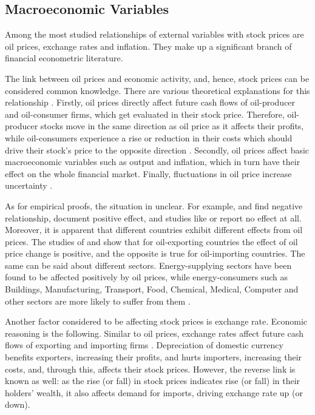 \documentclass[stu]{apa7}
\begin{document}
\subsection{Macroeconomic Variables}

Among the most studied relationships of external variables with stock prices are oil prices, exchange rates and inflation. They make up a significant branch of financial econometric literature.

The link between oil prices and economic activity, and, hence, stock prices can be considered common knowledge. There are various theoretical explanations for this relationship \citep{degiannakis_oil_2018}.
Firstly, oil prices directly affect future cash flows of oil-producer and oil-consumer firms, which get evaluated in their stock price. Therefore, oil-producer stocks move in the same direction as oil price as it affects their profits, while oil-consumers experience a rise or reduction in their costs which should drive their stock's price to the opposite direction \citep{basher_oil_2006, filis_dynamic_2011}.
Secondly, oil prices affect basic macroeconomic variables such as output and inflation, which in turn have their effect on the whole financial market.
Finally, fluctuations in oil price increase uncertainty \citep{brown_energy_2002}.

As for empirical proofs, the situation in unclear.
For example, \citet{basher_oil_2012} and \citet{filis_macro_2010} find negative relationship, \citet{narayan_modelling_2010} document positive effect, and studies like \citet{silvapulle_nonparametric_2017} or \citet{zhu_modelling_2014} report no effect at all.
Moreover, it is apparent that different countries exhibit different effects from oil prices. The studies of \citet{mohanty_oil_2011} and \citet{wang_oil_2013} show that for oil-exporting countries the effect of oil price change is positive, and the opposite is true for oil-importing countries.
The same can be said about different sectors. Energy-supplying sectors have been found to be affected positively by oil prices, while energy-consumers such as Buildings, Manufacturing, Transport, Food, Chemical, Medical, Computer and other sectors are more likely to suffer from them \citep{narayan_new_2011, elyasiani_oil_2011}.

Another factor considered to be affecting stock prices is exchange rate. Economic reasoning is the following. Similar to oil prices, exchange rates affect future cash flows of exporting and importing firms \citep{bahmani-oskooee_relation_2015}. Depreciation of domestic currency benefits exporters, increasing their profits, and hurts importers, increasing their costs, and, through this, affects their stock prices. However, the reverse link is known as well: as the rise (or fall) in stock prices indicates rise (or fall) in their holders' wealth, it also affects demand for imports, driving exchange rate up (or down).
\end{document}
